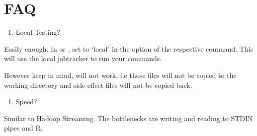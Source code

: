 \documentclass[letterpaper,10pt,english]{manual}
\begin{document}
\resetcurrentobjects
\hypertarget{--doc-FAQ}{}

\chapter{FAQ}
\begin{enumerate}
\item {} 
Local Testing?

\end{enumerate}

Easily enough. In  or , set  to
`local' in the  option of the respective command. This will
use the local jobtracker to run your commands.

However keep in mind,
 will not work, i.e those files will not be copied to the
working directory and side effect files will not be copied back.
\begin{enumerate}
\item {} 
Speed?

\end{enumerate}

Similar to Hadoop Streaming. The bottlenecks are writing and reading to STDIN
pipes and R.


\renewcommand{\indexname}{Module Index}
\printmodindex
\renewcommand{\indexname}{Index}
\printindex
\end{document}

